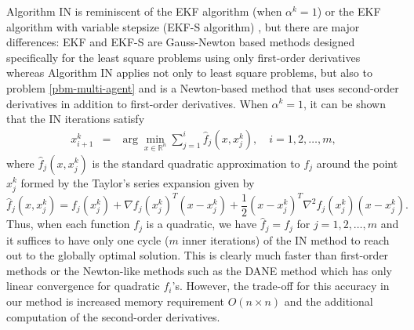 \documentclass[final,numbook]{svjour3}
\begin{document}
Algorithm IN is reminiscent of the EKF algorithm (when $\alpha^k=1$)  \cite{Bertsekas1996incremental} or the EKF algorithm with variable stepsize (EKF-S algorithm) \cite{AlgEkfs2003}, but there are major differences: EKF and EKF-S are Gauss-Newton based methods designed specifically for the least square problems using only first-order derivatives whereas Algorithm IN applies not only to least square problems, but also to problem \eqref{pbm-multi-agent} and is a Newton-based method that uses second-order derivatives in addition to first-order derivatives. When $\alpha^k=1$, it can be shown that the IN iterations satisfy
	\begin{eqnarray} \label{iter-incr-gauss-3} 
x_{i+1}^k &=& \arg \min_{x \in {\mathbb R}^n} \sum_{j=1}^i \hat{f}_j(x, x_j^k), \quad i=1,2,\dots,m,
	\end{eqnarray}
where $\hat{f}_j(x,x_j^k)$ is the standard quadratic approximation to $f_j$ around the point $x_j^k$ formed by the Taylor's series expansion given by 
\begin{equation}\label{eq-quadratic-approx-to-f}
 \hat{f}_j(x, x_j^k) = f_j(x_j^k) + \nabla f_j(x_j^k)^T (x - x_j^k) 
   + \frac{1}{2}(x - x_j^k) ^T \nabla^2 f_j(x_j^k) (x - x_j^k). 
\end{equation}
Thus, when each function $f_j$ is a quadratic, we have $\hat{f}_j = f_j$ for $j=1,2,\dots,m$ and it suffices to have only one cycle ($m$ inner iterations) of the IN method to reach out to the globally optimal solution. This is clearly much faster than first-order methods or the Newton-like methods such as the DANE method \cite{SrebroDane2013} which has only linear convergence for quadratic $f_i$'s. However, the trade-off for this accuracy in our method is increased memory requirement $O(n\times n)$ and the additional computation of the second-order derivatives.
   
\end{document}
